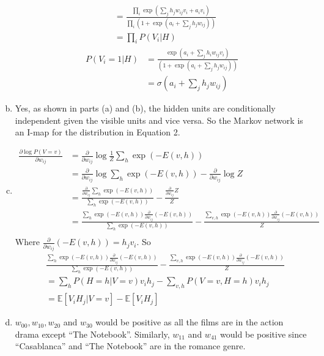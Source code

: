 \documentclass{article}
\begin{document}
\begin{enumerate}[(a)]
\begin{align*}
        &= \frac{\prod_i \exp(\sum_j h_j w_{ij}v_i + a_iv_i)}{\prod_i (1 + \exp(a_i + \sum_j h_jw_{ij}))} \\[0.5ex]
        &= \prod_i P(V_i| H)
    \end{align*}
    \begin{align*}
        P(V_i = 1 | H) &= \frac{\exp(a_i + \sum_j h_i w_{ij}v_i)}{(1 + \exp(a_i + \sum_j h_jw_{ij}))} \\[0.5ex]
        &= \sigma(a_i + \sum_{j} h_jw_{ij})
    \end{align*}
    \item Yes, as shown in parts (a) and (b), the hidden units are conditionally independent given the visible units and vice versa. So the Markov network is an I-map for the distribution in Equation 2.
    \item \begin{align*}
        \frac{\partial \log P(V = v)}{\partial w_{ij}} &= \frac{\partial}{\partial w_{ij}} \log \frac{1}{Z}\sum_{h}\exp(-E(v, h)) \\[0.5ex] 
        &= \frac{\partial}{\partial w_{ij}} \log \sum_{h} \exp(-E(v, h)) - \frac{\partial}{\partial w_{ij}} \log Z \\[0.5ex]
        &= \frac{\frac{\partial}{\partial w_{ij}}\sum_h \exp(-E(v, h))}{\sum_h \exp(-E(v,h))} - \frac{\frac{\partial}{\partial w_{ij}} Z}{Z} \\[0.5ex]
        &= \frac{\sum_h \exp(-E(v, h))\frac{\partial}{\partial w_{ij}}(-E(v, h))}{\sum_h \exp(-E(v, h))} - \frac{\sum_{v, h}\exp(-E(v,h))\frac{\partial}{\partial w_{ij}}(-E(v,h))}{Z} \\[0.5ex]
    \end{align*}
    Where $\frac{\partial}{\partial w_{ij}}(-E(v, h)) = h_jv_i$. So 
    \begin{align*}
       & \frac{\sum_h \exp(-E(v, h))\frac{\partial}{\partial w_{ij}}(-E(v, h))}{\sum_h \exp(-E(v, h))} - \frac{\sum_{v, h}\exp(-E(v,h))\frac{\partial}{\partial w_{ij}}(-E(v,h))}{Z} \\[0.5ex]
       &=  \sum_h P(H = h|V = v)v_ih_j - \sum_{v,h}P(V = v, H = h)v_ih_j \\[0.5ex]
       &= \mathbb{E}[V_iH_j|V = v] - \mathbb{E}[V_iH_j]
    \end{align*}
    \item $w_{00}, w_{10}, w_{20}$ and $w_{30}$ would be positive as all the films are in the action drama except ``The Notebook''. Similarly, $w_{11}$ and $w_{41}$ would be positive since ``Casablanca'' and ``The Notebook'' are in the romance genre.
\end{enumerate}
\end{document}
